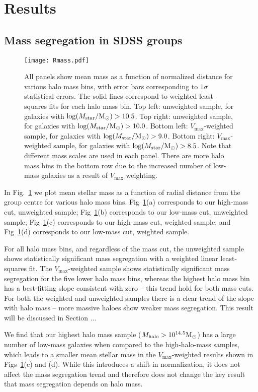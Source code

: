 \section{Results}
\label{sec:results_ms}

\subsection{Mass segregation in SDSS groups}

\begin{figure}[!ht]
  \centering
  \texttt{[image: Rmass.pdf]}
  \caption{All panels show mean mass as a function of normalized
    distance for various halo mass bins, with error bars corresponding
  to $1\sigma$ statistical errors.  The solid lines correspond to
  weighted least-squares fits for each halo mass bin.  Top left:
  unweighted sample, for galaxies with $\log(M_\mathrm{star}/\mathrm{M_{\odot}}) >
  10.5$.  Top right: unweighted sample, for galaxies with
  $\log(M_\mathrm{star}/\mathrm{M_{\odot}}) > 10.0$.  Bottom left:
  $V_\mathrm{max}$-weighted sample, for galaxies with
  $\log(M_\mathrm{star}/\mathrm{M_{\odot}}) > 9.0$.  Bottom right:
  $V_\mathrm{max}$-weighted sample, for galaxies with
  $\log(M_\mathrm{star}/\mathrm{M_{\odot}}) > 8.5$.  Note that different mass
  scales are used in each panel.  There are more halo mass bins in the
  bottom row due to the increased number of low-mass galaxies as a
  result of $V_\mathrm{max}$ weighting.}
  \label{fig:Rmass}
\end{figure}

In Fig.~\ref{fig:Rmass} we plot mean stellar mass as a function of
radial distance from the group centre for various halo mass bins.
Fig~\ref{fig:Rmass}(a) corresponds to our high-mass cut, unweighted
sample; Fig~\ref{fig:Rmass}(b) corresponds to our low-mass cut,
unweighted sample; Fig~\ref{fig:Rmass}(c) corresponds to our high-mass
cut, weighted sample; and Fig~\ref{fig:Rmass}(d) corresponds to our
low-mass cut, weighted sample.
\par
For all halo mass bins, and regardless of the mass cut, the unweighted
sample shows statistically significant mass segregation with a
weighted linear least-squares fit.  The $V_\mathrm{max}$-weighted
sample shows statistically significant mass segregation for the five
lower halo mass bins, whereas the highest halo mass bin has a
best-fitting slope consistent with zero -- this trend hold for both
mass cuts.  For both the weighted and unweighted samples there is a
clear trend of the slope with halo mass -- more massive haloes show
weaker mass segregation.  This result will be discussed in Section ...
\par
We find that our highest halo mass sample ($M_\mathrm{halo} >
10^{14.5}\mathrm{M_{\odot}}$) has a large number of low-mass galaxies when compared
to the high-halo-mass samples, which leads to a smaller mean stellar
mass in the $V_\mathrm{max}$-weighted results shown in
Figs~\ref{fig:Rmass}(c) and (d).  While this introduces a shift in
normalization, it does not affect the mass segregation trend and
therefore does not change the key result that mass segregation depends
on halo mass.

